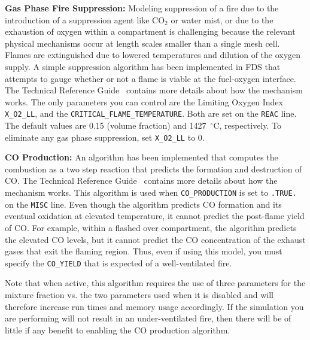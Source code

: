 \documentclass[11pt]{book}
\newcommand{\ct}{\tt\small}
\begin{document}
\vspace{\baselineskip}
\noindent
{\bf Gas Phase Fire Suppression:}
Modeling suppression of a fire due to the introduction of a suppression
agent like CO$_2$ or water mist, or due to the exhaustion of oxygen
within a compartment is challenging because
the relevant physical mechanisms occur at length scales smaller than a
single mesh cell. Flames are extinguished due to lowered
temperatures and dilution of the oxygen supply. A simple
suppression algorithm has been implemented in FDS that attempts to
gauge whether or not a flame is viable at the fuel-oxygen interface. The Technical Reference Guide~\cite{FDS_Tech_Guide_5}
contains more details about how the mechanism works. The only
parameters you can control are the Limiting
Oxygen Index {\ct X\_O2\_LL},
and the {\ct CRITICAL\_FLAME\_TEMPERATURE}. Both are
set on the {\ct REAC} line.
The default values are 0.15 (volume fraction) and 1427~$^\circ$C, respectively.
To eliminate any gas phase suppression, set {\ct X\_O2\_LL} to 0.

\vspace{\baselineskip}
\noindent
{\bf CO Production:}
An algorithm has been implemented that computes the combustion as a two step reaction that
predicts the formation and destruction of CO.  The Technical Reference Guide~\cite{FDS_Tech_Guide_5}
contains more details about how the mechanism works. This algorithm is used when
{\ct CO\_PRODUCTION} is set to {\ct .TRUE.} on the {\ct MISC} line. Even though the algorithm predicts
CO formation and its eventual oxidation at elevated temperature, it cannot predict the post-flame
yield of CO. For example, within a flashed over compartment, the algorithm predicts the elevated
CO levels, but it cannot predict the CO concentration of the exhaust gases that exit the flaming region.
Thus, even if using this model, you must specify the {\ct CO\_YIELD} that is expected of a well-ventilated fire.

\begin{warning}
\noindent
Note that when active, this algorithm requires the use of three parameters
for the mixture fraction vs. the two parameters used when it is disabled and will therefore
increase run times and memory usage accordingly.  If the simulation you are
performing will not result in an under-ventilated fire, then there will be of
little if any benefit to enabling the CO production algorithm.
\end{warning}



\clearpage
\end{document}
